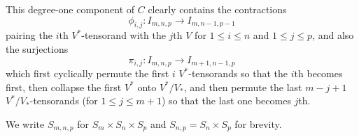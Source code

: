 \documentclass[11pt]{article}
\theoremstyle{plain}
\theoremstyle{nonumberplain}
\theoremstyle{plain}
\theoremstyle{nonumberplain}
\begin{document}
This degree-one component of $C$ clearly contains the contractions 
\begin{equation*}
  \phi_{i,j}:I_{m,n,p}\to I_{m,n-1,p-1}
\end{equation*}
pairing the $i$th $V^*$-tensorand with the $j$th $V$ for $1\le i\le n$ and $1\le j\le p$, and also the surjections
\begin{equation*}
  \pi_{i,j}: I_{m,n,p}\to I_{m+1,n-1,p} 
\end{equation*}
which first cyclically permute the first $i$ $V^*$-tensorands so that the $i$th becomes first, then collapse the first $V^*$ onto $V^*/V_*$, and then permute the last $m-j+1$ $V^*/V_*$-tensorands (for $1\le j\le m+1$) so that the last one becomes $j$th. 

We write $S_{m,n,p}$ for $S_m\times S_n\times S_p$ and $S_{n,p}=S_n\times S_p$ for brevity.
\end{document}
